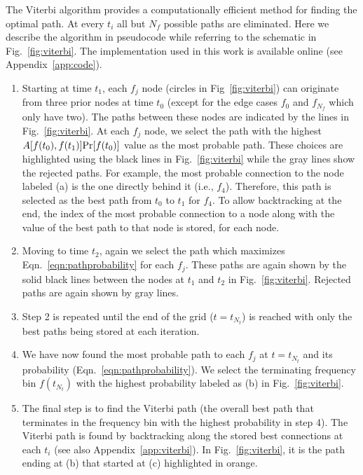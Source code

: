 \documentclass[paper-main.tex]{subfiles}
\begin{document}
The Viterbi algorithm provides a computationally efficient method for finding the optimal path. 
At every $t_i$ all but $N_f$ possible paths are eliminated. 
Here we describe the algorithm in pseudocode while referring to the schematic in Fig.~\ref{fig:viterbi}. %
The implementation used in this work is available online (see Appendix~\ref{app:code}).
\begin{enumerate}
\item Starting at time $t_1$, each $f_j$ node (circles in Fig~\ref{fig:viterbi}) can originate from three prior nodes at time $t_0$ (except for the edge cases $f_0$ and $f_{N_f}$ which only have two). 
The paths between these nodes are indicated by the lines in Fig.~\ref{fig:viterbi}. 
At each $f_j$ node, we select the path with the highest $A[f(t_0),f(t_1)] {\rm Pr}[f(t_0)]$ value as the most probable path. 
These choices are highlighted using the black lines in Fig.~\ref{fig:viterbi} while the gray lines show the rejected paths. 
For example, the most probable connection to the node labeled (a) is the one directly behind it (i.e., $f_4$). 
Therefore, this path is selected as the best path from $t_0$ to $t_1$ for $f_4$.
To allow backtracking at the end, the index of the most probable connection to a node along with the value of the best path to that node is stored, for each node.

\item Moving to time $t_2$, again we select the path which maximizes Eqn.~\ref{eqn:pathprobability} for each $f_j$. 
These paths are again shown by the solid black lines between the nodes at $t_1$ and $t_2$ in Fig.~\ref{fig:viterbi}.
Rejected paths are again shown by gray lines. 

\item Step 2 is repeated until the end of the grid ($t=t_{N_t}$) is reached with only the best paths being stored at each iteration. 

\item We have now found the most probable path to each $f_j$ at $t=t_{N_t}$ and its probability (Eqn.~\ref{eqn:pathprobability}). 
We select the terminating frequency bin $f(t_{N_t})$ with the highest probability labeled as (b) in Fig.~\ref{fig:viterbi}.

\item The final step is to find the Viterbi path (the overall best path that terminates in the frequency bin with the highest probability in step 4). 
The Viterbi path is found by backtracking along the stored best connections at each $t_i$ (see also Appendix~\ref{app:viterbi}). 
In Fig.~\ref{fig:viterbi}, it is the path ending at (b) that started at (c) highlighted in orange.
\end{enumerate}
\end{document}
